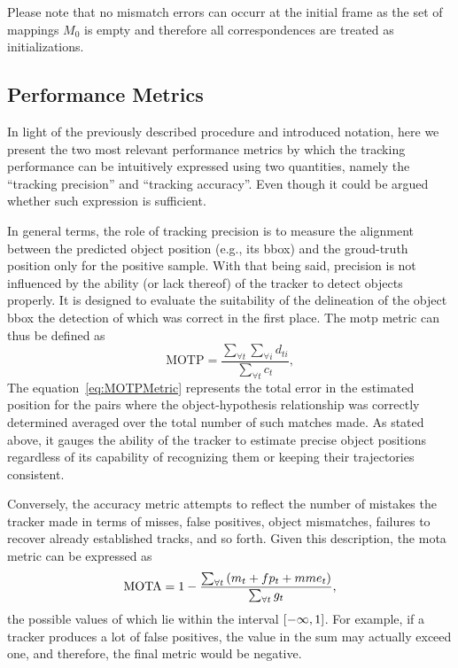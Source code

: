 Please note that no mismatch errors can occurr at the initial frame as the set of mappings $M_0$ is empty and therefore all correspondences are treated as initializations.

\subsection{Performance Metrics}

In light of the previously described procedure and introduced notation, here we present the two most relevant performance metrics by which the tracking performance can be intuitively expressed using two quantities, namely the ``tracking precision'' and ``tracking accuracy''. Even though it could be argued whether such expression is sufficient.

In general terms, the role of tracking precision is to measure the alignment between the predicted object position (e.g., its \gls{bbox}) and the groud-truth position only for the positive sample. With that being said, precision is not influenced by the ability (or lack thereof) of the tracker to detect objects properly. It is designed to evaluate the suitability of the delineation of the object \gls{bbox} the detection of which was correct in the first place. The \gls{motp} metric can thus be defined as
\begin{equation}
    \label{eq:MOTPMetric}
    \text{MOTP} = \frac{\sum_{\forall t} \sum_{\forall i} d_{ti}}{\sum_{\forall t} c_t},
\end{equation}
The equation~\ref{eq:MOTPMetric} represents the total error in the estimated position for the pairs where the object-hypothesis relationship was correctly determined averaged over the total number of such matches made. As stated above, it gauges the ability of the tracker to estimate precise object positions regardless of its capability of recognizing them or keeping their trajectories consistent.

Conversely, the accuracy metric attempts to reflect the number of mistakes the tracker made in terms of misses, false positives, object mismatches, failures to recover already established tracks, and so forth. Given this description, the \gls{mota} metric can be expressed as
\begin{equation}
    \label{eq:MOTAMetric}
    \text{MOTA} = 1 - \frac{\sum_{\forall t} \left( {m_t + fp_t + mme_t} \right)}{\sum_{\forall t} g_t},
\end{equation}
the possible values of which lie within the interval $\left[ {-\infty, 1} \right]$. For example, if a tracker produces a lot of false positives, the value in the sum may actually exceed one, and therefore, the final metric would be negative.

